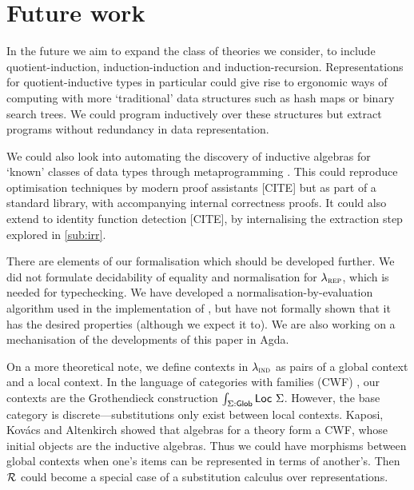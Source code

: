 \section{Future work}


In the future we aim to expand the class of theories we consider, to include
quotient-induction, induction-induction and induction-recursion. Representations
for quotient-inductive types in particular could give rise to ergonomic ways of
computing with more `traditional' data structures such as hash maps or binary
search trees. We could program inductively over these structures but extract
programs without redundancy in data representation.

We could also look into automating the discovery of inductive algebras for
`known' classes of data types through metaprogramming \cite{Dagand2017-nj}. This
could reproduce optimisation techniques by modern proof assistants [CITE] but as
part of a standard library, with accompanying internal correctness proofs. It
could also extend to identity function detection [CITE], by internalising the
extraction step explored in \cref{sub:irr}.

There are elements of our formalisation which should be developed further. We
did not formulate decidability of equality and normalisation for $\lambda_{\textsc{rep}}$,
which is needed for typechecking. We have developed a
normalisation-by-evaluation \cite{Altenkirch2020-rm} algorithm used in the
implementation of \superfluid, but have not formally shown that it has the
desired properties (although we expect it to). We are also working on a
mechanisation of the developments of this paper in Agda.



On a more theoretical note, we define contexts in $\lambda_{\textsc{ind}}$ as pairs of a
global context and a local context. In the language of categories with
families (CWF) \cite{Castellan2019-qo}, our contexts are the Grothendieck
construction $\int _{\Sigma : \textsf{Glob}} \textsf{Loc}\ \Sigma$. However, the base
category is discrete---substitutions only exist between local contexts. Kaposi,
Kov\'acs and Altenkirch \cite{Kaposi2019-pj} showed that algebras for a theory
form a CWF, whose initial objects are the inductive algebras. Thus we could have
morphisms between global contexts when one's items can be represented in terms of
another's. Then $\mathcal{R}$ could become a special case of a substitution calculus over
representations.

